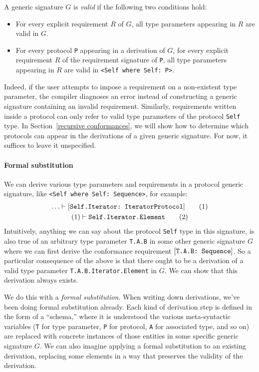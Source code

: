 \documentclass[../generics]{subfiles}
\begin{document}
\begin{definition}\label{valid generic signature def}
A generic signature $G$ is \emph{valid} if the following two conditions hold:
\begin{itemize}
\item For every explicit requirement $R$ of $G$, all type parameters appearing in $R$ are valid in $G$.
\item For every protocol \texttt{P} appearing in a derivation of $G$, for every explicit requirement $R$ of the requirement signature of \texttt{P}, all type parameters appearing in $R$ are valid in \verb|<Self where Self: P>|.
\end{itemize}
\end{definition}
Indeed, if the user attempts to impose a requirement on a non-existent type parameter, the compiler diagnoses an error instead of constructing a generic signature containing an invalid requirement. Similarly, requirements written inside a protocol can only refer to valid type parameters of the protocol \texttt{Self} type. In Section~\ref{recursive conformances}, we will show how to determine which protocols can appear in the derivations of a given generic signature. For now, it suffices to leave it unspecified.

\paragraph{Formal substitution}
We can derive various type parameters and requirements in a protocol generic signature, like \verb|<Self where Self: Sequence>|, for example:
\begin{gather*}
\ldots\vdash [\texttt{Self.Iterator:~IteratorProtocol}]\tag{1}\\
(1)\vdash \texttt{Self.Iterator.Element}\tag{2}
\end{gather*}
Intuitively, anything we can say about the protocol \texttt{Self} type in this signature, is also true of an arbitrary type parameter \texttt{T.A.B} in some other generic signature $G$ where we can first derive the conformance requirement $[\texttt{T.A.B:~Sequence}]$. So a particular consequence of the above is that there ought to be a derivation of a valid type parameter \texttt{T.A.B.Iterator.Element} in $G$. We can show that this derivation always exists.

We do this with a \emph{formal substitution}. When writing down derivations, we've been doing formal substitution already. Each kind of derivation step is defined in the form of a ``schema,'' where it is understood the various meta-syntactic variables (\texttt{T} for type parameter, \texttt{P} for protocol, \texttt{A} for associated type, and so on) are replaced with concrete instances of those entities in some specific generic signature $G$. We can also imagine applying a formal substitution to an existing derivation, replacing some elements in a way that preserves the validity of the derivation.
\end{document}
